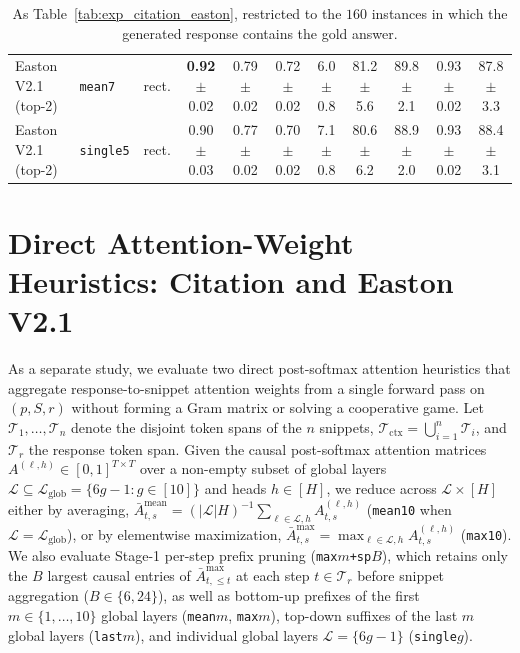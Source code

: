 \begin{table}[t]
{\begin{tabular}{lllcccccccc}
Easton V2.1 (top-2) & \texttt{mean7} & rect. & \textbf{0.92}{\scriptsize$\pm$0.02} & 0.79{\scriptsize$\pm$0.02} & 0.72{\scriptsize$\pm$0.02} & 6.0{\scriptsize$\pm$0.8} & 81.2{\scriptsize$\pm$5.6} & 89.8{\scriptsize$\pm$2.1} & 0.93{\scriptsize$\pm$0.02} & 87.8{\scriptsize$\pm$3.3} \\
Easton V2.1 (top-2) & \texttt{single5} & rect. & 0.90{\scriptsize$\pm$0.03} & 0.77{\scriptsize$\pm$0.02} & 0.70{\scriptsize$\pm$0.02} & 7.1{\scriptsize$\pm$0.8} & 80.6{\scriptsize$\pm$6.2} & 88.9{\scriptsize$\pm$2.0} & 0.93{\scriptsize$\pm$0.02} & 88.4{\scriptsize$\pm$3.1} \\
\bottomrule
\end{tabular}%
}
\caption{As Table~\ref{tab:exp_citation_easton}, restricted to the $160$ instances in which the generated response contains the gold answer.}
\label{tab:exp_citation_easton_correct}
\end{table}



\newpage

\section{Direct Attention-Weight Heuristics: Citation and Easton V2.1}
\label{subsec:exp_citation_easton}

As a separate study, we evaluate two direct post-softmax attention heuristics that aggregate response-to-snippet attention weights from a single forward pass on $(p, S, r)$ without forming a Gram matrix or solving a cooperative game. Let $\mathcal{T}_1, \dots, \mathcal{T}_n$ denote the disjoint token spans of the $n$ snippets, $\mathcal{T}_{\text{ctx}} = \bigcup_{i=1}^n \mathcal{T}_i$, and $\mathcal{T}_r$ the response token span. Given the causal post-softmax attention matrices $A^{(\ell, h)} \in [0, 1]^{T \times T}$ over a non-empty subset of global layers $\mathcal{L} \subseteq \mathcal{L}_{\text{glob}} = \{6g - 1 : g \in [10]\}$ and heads $h \in [H]$, we reduce across $\mathcal{L} \times [H]$ either by averaging, $\bar{A}^{\text{mean}}_{t, s} = (|\mathcal{L}| H)^{-1} \sum_{\ell \in \mathcal{L}, h} A^{(\ell, h)}_{t, s}$ (\texttt{mean10} when $\mathcal{L} = \mathcal{L}_{\text{glob}}$), or by elementwise maximization, $\bar{A}^{\max}_{t, s} = \max_{\ell \in \mathcal{L}, h} A^{(\ell, h)}_{t, s}$ (\texttt{max10}). We also evaluate Stage-1 per-step prefix pruning (\texttt{max}$m$\texttt{+sp}$B$), which retains only the $B$ largest causal entries of $\bar{A}^{\max}_{t, \le t}$ at each step $t \in \mathcal{T}_r$ before snippet aggregation ($B \in \{6, 24\}$), as well as bottom-up prefixes of the first $m \in \{1, \dots, 10\}$ global layers (\texttt{mean}$m$, \texttt{max}$m$), top-down suffixes of the last $m$ global layers (\texttt{last}$m$), and individual global layers $\mathcal{L} = \{6g - 1\}$ (\texttt{single}$g$).

